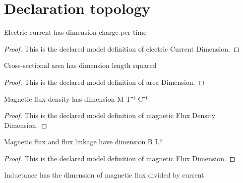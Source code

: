 \section{Declaration topology}
\begin{definition}
  \label{def:physics:phyx-mini-0939:phyxminiproblems-problemphyxmini0939-electriccurrentdimension}
  Electric current has dimension charge per time
\end{definition}
\begin{proof}
  This is the declared model definition of electric Current Dimension.
\end{proof}
\begin{definition}
  \label{def:physics:phyx-mini-0939:phyxminiproblems-problemphyxmini0939-areadimension}
  Cross-sectional area has dimension length squared
\end{definition}
\begin{proof}
  This is the declared model definition of area Dimension.
\end{proof}
\begin{definition}
  \label{def:physics:phyx-mini-0939:phyxminiproblems-problemphyxmini0939-magneticfluxdensitydimension}
  Magnetic flux density has dimension M T⁻¹ C⁻¹
\end{definition}
\begin{proof}
  This is the declared model definition of magnetic Flux Density Dimension.
\end{proof}
\begin{definition}
  \label{def:physics:phyx-mini-0939:phyxminiproblems-problemphyxmini0939-magneticfluxdimension}
  Magnetic flux and flux linkage have dimension B L²
\end{definition}
\begin{proof}
  This is the declared model definition of magnetic Flux Dimension.
\end{proof}
\begin{definition}
  \label{def:physics:phyx-mini-0939:phyxminiproblems-problemphyxmini0939-inductancedimension}
  Inductance has the dimension of magnetic flux divided by current
\end{definition}
